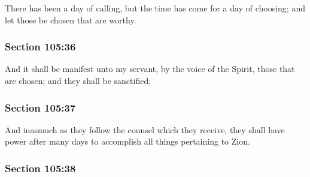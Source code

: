 		There has been a day of calling, but the time has come for a day of choosing; and let those be chosen that are worthy.


	\subsubsection{Section 105:36} %
		\label{DC105-36}

		And it shall be manifest unto my servant, by the voice of the Spirit, those that are chosen; and they shall be sanctified;


	\subsubsection{Section 105:37} %
		\label{DC105-37}

		And inasmuch as they follow the counsel which they receive, they shall have power after many days to accomplish all things pertaining to Zion.


	\subsubsection{Section 105:38} %
		\label{DC105-38}

